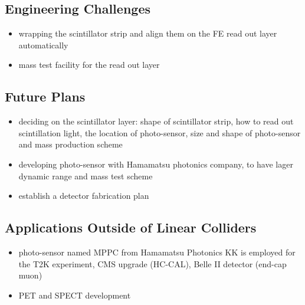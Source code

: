 \subsection{Engineering Challenges}
\begin{itemize}
	\item wrapping the scintillator strip and align them on the FE read out layer automatically
	\item mass test facility for the read out layer
\end{itemize}

\subsection{Future Plans}
\begin{itemize}
	\item deciding on the scintillator layer: shape of scintillator strip, how to read out scintillation light, the location of  photo-sensor, size and shape of photo-sensor and mass production scheme
	\item developing photo-sensor with Hamamatsu photonics company, to have lager dynamic range and mass test scheme
	\item establish a detector fabrication plan
\end{itemize}

\subsection{Applications Outside of Linear Colliders}
\begin{itemize}
	\item photo-sensor named MPPC from Hamamatsu Photonics KK is employed for the T2K experiment, CMS upgrade (HC-CAL), Belle II detector (end-cap muon)
	\item PET and SPECT development
\end{itemize}
